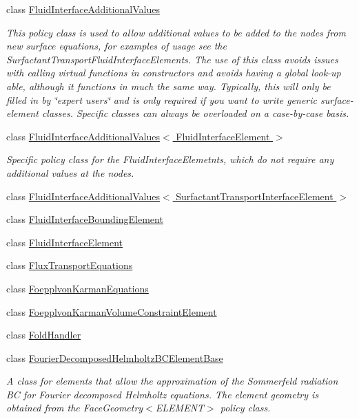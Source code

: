 \begin{DoxyCompactItemize}
class \hyperlink{classoomph_1_1FluidInterfaceAdditionalValues}{Fluid\+Interface\+Additional\+Values}
\begin{DoxyCompactList}\small\item\em This policy class is used to allow additional values to be added to the nodes from new surface equations, for examples of usage see the Surfactant\+Transport\+Fluid\+Interface\+Elements. The use of this class avoids issues with calling virtual functions in constructors and avoids having a global look-\/up able, although it functions in much the same way. Typically, this will only be filled in by \char`\"{}expert users\char`\"{} and is only required if you want to write generic surface-\/element classes. Specific classes can always be overloaded on a case-\/by-\/case basis. \end{DoxyCompactList}\item 
class \hyperlink{classoomph_1_1FluidInterfaceAdditionalValues_3_01FluidInterfaceElement_01_4}{Fluid\+Interface\+Additional\+Values$<$ Fluid\+Interface\+Element $>$}
\begin{DoxyCompactList}\small\item\em Specific policy class for the Fluid\+Interface\+Elemetnts, which do not require any additional values at the nodes. \end{DoxyCompactList}\item 
class \hyperlink{classoomph_1_1FluidInterfaceAdditionalValues_3_01SurfactantTransportInterfaceElement_01_4}{Fluid\+Interface\+Additional\+Values$<$ Surfactant\+Transport\+Interface\+Element $>$}
\item 
class \hyperlink{classoomph_1_1FluidInterfaceBoundingElement}{Fluid\+Interface\+Bounding\+Element}
\item 
class \hyperlink{classoomph_1_1FluidInterfaceElement}{Fluid\+Interface\+Element}
\item 
class \hyperlink{classoomph_1_1FluxTransportEquations}{Flux\+Transport\+Equations}
\item 
class \hyperlink{classoomph_1_1FoepplvonKarmanEquations}{Foepplvon\+Karman\+Equations}
\item 
class \hyperlink{classoomph_1_1FoepplvonKarmanVolumeConstraintElement}{Foepplvon\+Karman\+Volume\+Constraint\+Element}
\item 
class \hyperlink{classoomph_1_1FoldHandler}{Fold\+Handler}
\item 
class \hyperlink{classoomph_1_1FourierDecomposedHelmholtzBCElementBase}{Fourier\+Decomposed\+Helmholtz\+B\+C\+Element\+Base}
\begin{DoxyCompactList}\small\item\em A class for elements that allow the approximation of the Sommerfeld radiation BC for Fourier decomposed Helmholtz equations. The element geometry is obtained from the Face\+Geometry$<$\+E\+L\+E\+M\+E\+N\+T$>$ policy class. \end{DoxyCompactList}\item 

\end{DoxyCompactItemize}
